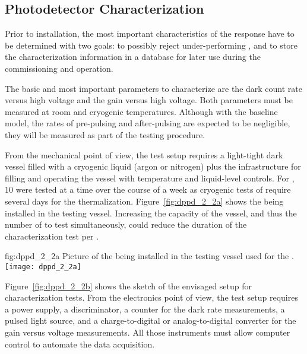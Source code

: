 \subsection{Photodetector Characterization}
\label{sec:dp-pds-selection-characterization}

Prior to installation, the most important characteristics of the  response have to be determined with two goals: to possibly reject under-performing , and to store the characterization information in a database for later use during the  commissioning and operation.

The basic and most important parameters to characterize are the dark count rate versus high voltage and the gain versus high voltage. Both parameters must be measured at room and  cryogenic temperatures. Although with the baseline  model, the rates of pre-pulsing and after-pulsing are expected to be negligible, they will be measured as part of the testing procedure. 

From the mechanical point of view, the test setup requires a light-tight dark vessel filled with a cryogenic liquid (argon or nitrogen) plus the infrastructure for filling and operating the vessel with temperature and liquid-level controls. For , \num{10}  were tested at a time over the course of a week as cryogenic tests of   require several days for the  thermalization. Figure~\ref{fig:dppd_2_2a} shows the    being installed in the testing vessel.
Increasing the capacity of the vessel, and thus the number of  to test simultaneously,
could reduce the duration of the characterization test per .

\begin{dunefigure}{fig:dppd_2_2a}
{Picture of the  being installed in the testing vessel used for the  .}
\texttt{[image: dppd\_2\_2a]}
\end{dunefigure}

Figure~\ref{fig:dppd_2_2b} shows the sketch of the envisaged setup for  characterization tests. From the electronics point of view, the test setup requires a  power supply, a discriminator, a counter for the dark rate measurements, a pulsed light source, and a charge-to-digital or analog-to-digital converter for the  gain versus voltage measurements. All those instruments must allow computer control to automate the data acquisition.

